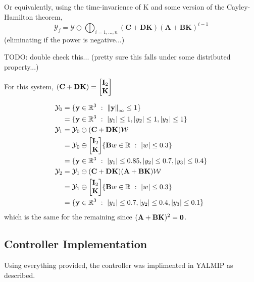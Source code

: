\documentclass[]{article}
\newcommand{\R}{\mathbb{R}}
\newcommand{\st}{\ : \ }
\begin{document}
Or equivalently, using the time-invarience of K and some version of the Cayley-Hamilton theorem, 
\begin{equation}
    \mathcal{Y}_{j} = \mathcal{Y} \ominus \bigoplus_{i = 1,\dots,n} (\mathbf{C+DK}) (\mathbf{A+BK})^{i-1}
\end{equation}
(eliminating if the power is negative...)

TODO: double check this... (pretty sure this falls under some distributed property...)

For this system,
$(\mathbf{C+DK}) = \mqty[\vb{I}_2\\\mathbf{K}]$

\begin{equation}
    \begin{aligned}
        \mathcal{Y}_0 &= \{\vb{y} \in \R^3 \st \norm{\vb{y}}_{\infty}\leq 1\}\\
            &= \{\vb{y} \in \R^{3} \st \abs{y_1} \leq 1, \abs{y_2} \leq 1, \abs{y_3}\leq 1\}\\
        \mathcal{Y}_1 &= \mathcal{Y}_0 \ominus (\mathbf{C+DK}) \mathcal{W}\\
            &= \mathcal{Y}_0 \ominus \mqty[\vb{I}_2\\\mathbf{K}] \{ \vb{B} w \in \R \st \abs{w} \leq 0.3\}\\
            &= \{\vb{y} \in \R^{3} \st \abs{y_1} \leq 0.85, \abs{y_2} \leq 0.7, \abs{y_3}\leq 0.4\}\\
        \mathcal{Y}_2 &= \mathcal{Y}_1 \ominus (\mathbf{C+DK}) \mathbf{(A+BK)}\mathcal{W}\\
            &= \mathcal{Y}_1 \ominus \mqty[\vb{I}_2\\\mathbf{K}] \{\vb{B} w \in \R \st \abs{w} \leq 0.3\}\\
            &= \{\vb{y} \in \R^{3} \st \abs{y_1} \leq 0.7, \abs{y_2} \leq 0.4, \abs{y_3}\leq 0.1\}\\
    \end{aligned}
\end{equation}
which is the same for the remaining since $(\mathbf{A+BK})^2 = \vb{0}$.

\subsection{Controller Implementation}
Using everything provided, the controller was implimented in YALMIP as described.

\end{document}
